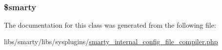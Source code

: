 \subsubsection[{\$smarty}]{\setlength{\rightskip}{0pt plus 5cm}\$smarty}\label{class_smarty___internal___config___file___compiler_ac3ae29e9ccbb2006fa26fd9eb2c12117}


The documentation for this class was generated from the following file\+:\begin{DoxyCompactItemize}
\item 
libs/smarty/libs/sysplugins/\hyperlink{smarty__internal__config__file__compiler_8php}{smarty\+\_\+internal\+\_\+config\+\_\+file\+\_\+compiler.\+php}\end{DoxyCompactItemize}
